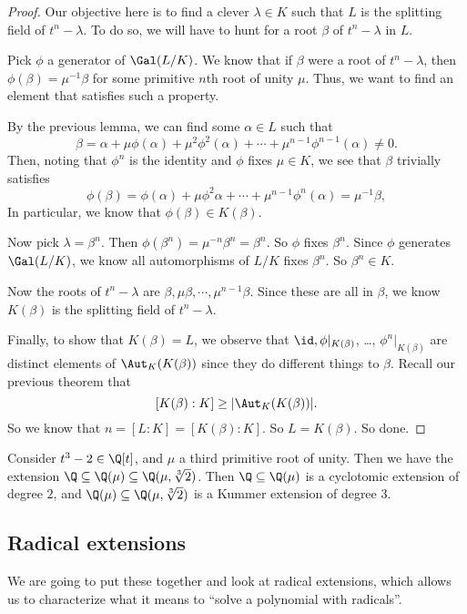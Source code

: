 \documentclass[a4paper]{article}
\begin{document}
\begin{proof}
  Our objective here is to find a clever $\lambda \in K$ such that $L$ is the splitting field of $t^n - \lambda$. To do so, we will have to hunt for a root $\beta$ of $t^n - \lambda$ in $L$.

  Pick $\phi$ a generator of $\Gal(L/K)$. We know that if $\beta$ were a root of $t^n - \lambda$, then $\phi(\beta) = \mu^{-1} \beta$ for some primitive $n$th root of unity $\mu$. Thus, we want to find an element that satisfies such a property.

  By the previous lemma, we can find some $\alpha \in L$ such that
  \[
    \beta = \alpha + \mu\phi(\alpha) + \mu^2\phi^2(\alpha) + \cdots + \mu^{n - 1}\phi^{n - 1}(\alpha) \not= 0.
  \]
  Then, noting that $\phi^n$ is the identity and $\phi$ fixes $\mu \in K$, we see that $\beta$ trivially satisfies
  \[
    \phi(\beta) = \phi(\alpha) + \mu \phi^2 \alpha + \cdots + \mu^{n - 1} \phi^n (\alpha) = \mu^{-1}\beta,
  \]
  In particular, we know that $\phi(\beta) \in K(\beta)$.

  Now pick $\lambda = \beta^n$. Then $\phi(\beta^n) = \mu^{-n} \beta^n = \beta^n$. So $\phi$ fixes $\beta^n$. Since $\phi$ generates $\Gal(L/K)$, we know all automorphisms of $L/K$ fixes $\beta^n$. So $\beta^n \in K$.

  Now the roots of $t^n - \lambda$ are $\beta, \mu \beta, \cdots, \mu^{n - 1}\beta$. Since these are all in $\beta$, we know $K(\beta)$ is the splitting field of $t^n - \lambda$.

  Finally, to show that $K(\beta) = L$, we observe that $\id, \phi|_{K(\beta)}$, \ldots, $\phi^n|_{K(\beta)}$ are distinct elements of $\Aut_K(K(\beta))$ since they do different things to $\beta$. Recall our previous theorem that
  \[
    [K(\beta):K] \geq |\Aut_K (K(\beta))|.
  \]
  So we know that $n = [L:K] = [K(\beta):K]$. So $L = K(\beta)$. So done.
\end{proof}

\begin{eg}
  Consider $t^3 - 2 \in \Q[t]$, and $\mu$ a third primitive root of unity. Then we have the extension $\Q\subseteq \Q(\mu) \subseteq \Q(\mu, \sqrt[3]{2})$. Then $\Q\subseteq \Q(\mu)$ is a cyclotomic extension of degree $2$, and $\Q(\mu) \subseteq \Q(\mu, \sqrt[3]{2})$ is a Kummer extension of degree 3.
\end{eg}

\subsection{Radical extensions}
We are going to put these together and look at radical extensions, which allows us to characterize what it means to ``solve a polynomial with radicals''.
\end{document}
